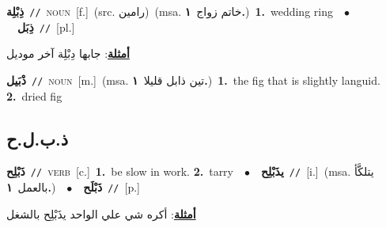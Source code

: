 \documentclass[10pt,a4paper,twoside]{article} %
\begin{document}
\begin{multicols}{2}
{{\setlength\topsep{0pt}\textbf{\foreignlanguage{arabic}{ذِبْلِة}}\ {\color{gray}\texttt{//}\color{black}}\ \textsc{noun}\ [f.]\ (src. \color{gray}\foreignlanguage{arabic}{رامين}\color{black})\ \color{gray}(msa. \foreignlanguage{arabic}{خاتم زواج}~\foreignlanguage{arabic}{\textbf{١.}})\color{black}\ \textbf{1.}~wedding ring\ \ $\bullet$\ \ \setlength\topsep{0pt}\textbf{\foreignlanguage{arabic}{ذِبَل}}\ {\color{gray}\texttt{//}\color{black}}\ [pl.]\  \begin{flushright}\color{gray}\foreignlanguage{arabic}{\textbf{\underline{\foreignlanguage{arabic}{أمثلة}}}: جابها دِبْلِة آخر موديل}\end{flushright}\color{black}} \vspace{2mm}

{\setlength\topsep{0pt}\textbf{\foreignlanguage{arabic}{ذْبَيل}}\ {\color{gray}\texttt{//}\color{black}}\ \textsc{noun}\ [m.]\ \color{gray}(msa. \foreignlanguage{arabic}{تين ذابل قليلا}~\foreignlanguage{arabic}{\textbf{١.}})\color{black}\ \textbf{1.}~the fig that is slightly languid.  \textbf{2.}~dried fig\ 

\vspace{-3mm}
\subsection*{\color{blue}\foreignlanguage{arabic}{ذ.ب.ل.ح}\color{blue}{}} 

{\setlength\topsep{0pt}\textbf{\foreignlanguage{arabic}{ذَبْلِح}}\ {\color{gray}\texttt{//}\color{black}}\ \textsc{verb}\ [c.]\ \textbf{1.}~be slow in work.  \textbf{2.}~tarry\ \ $\bullet$\ \ \setlength\topsep{0pt}\textbf{\foreignlanguage{arabic}{يذَبْلِح}}\ {\color{gray}\texttt{//}\color{black}}\ [i.]\ \color{gray}(msa. \foreignlanguage{arabic}{يتلكَّأ بالعمل}~\foreignlanguage{arabic}{\textbf{١.}})\color{black}\ \ $\bullet$\ \ \setlength\topsep{0pt}\textbf{\foreignlanguage{arabic}{ذَبْلَح}}\ {\color{gray}\texttt{//}\color{black}}\ [p.]\  \begin{flushright}\color{gray}\foreignlanguage{arabic}{\textbf{\underline{\foreignlanguage{arabic}{أمثلة}}}: أكره شي علي الواحد يذَبْلِح بالشغل}\end{flushright}\color{black}} \vspace{2mm}

}}
\end{multicols}
\end{document}
